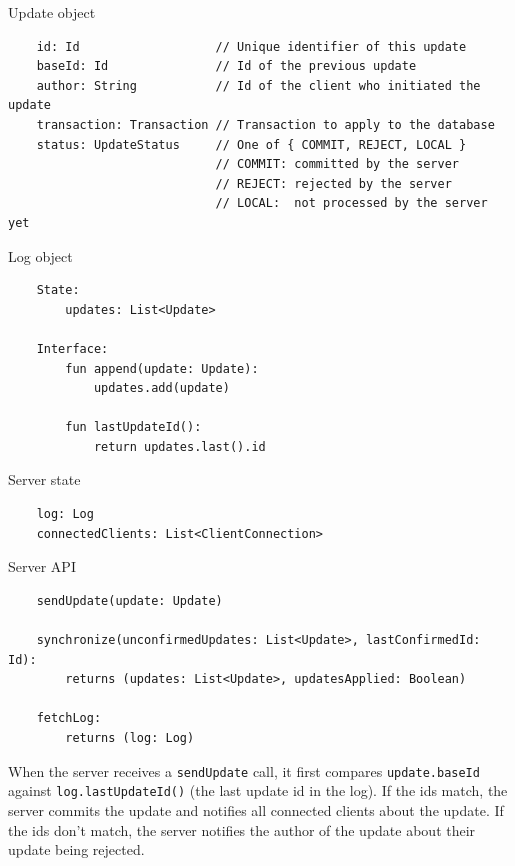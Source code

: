 \documentclass[a4paper, 11pt, oneside]{article}
\theoremstyle{definition}
\begin{document}
\begin{algorithm}
    \caption{Update object}\label{alg:update}
    \begin{verbatim}
    id: Id                   // Unique identifier of this update
    baseId: Id               // Id of the previous update
    author: String           // Id of the client who initiated the update
    transaction: Transaction // Transaction to apply to the database
    status: UpdateStatus     // One of { COMMIT, REJECT, LOCAL }
                             // COMMIT: committed by the server
                             // REJECT: rejected by the server
                             // LOCAL:  not processed by the server yet
    \end{verbatim}
\end{algorithm}

\begin{algorithm}
    \caption{Log object}\label{alg:log}
    \begin{verbatim}
    State:
        updates: List<Update>
    
    Interface:
        fun append(update: Update):
            updates.add(update)

        fun lastUpdateId():
            return updates.last().id

    \end{verbatim}
\end{algorithm}

\begin{algorithm}
    \caption{Server state}\label{alg:server-state}
    \begin{verbatim}
    log: Log
    connectedClients: List<ClientConnection>
    \end{verbatim}
\end{algorithm}

\begin{algorithm}
    \caption{Server API}\label{alg:server-api}
    \begin{verbatim}
    sendUpdate(update: Update)

    synchronize(unconfirmedUpdates: List<Update>, lastConfirmedId: Id): 
        returns (updates: List<Update>, updatesApplied: Boolean)

    fetchLog:
        returns (log: Log)
    \end{verbatim}
\end{algorithm}

When the server receives a \verb|sendUpdate| call, it first compares \verb|update.baseId| against \verb|log.lastUpdateId()| (the last update id in the log). If the ids match, the server commits the update and notifies all connected clients about the update. If the ids don't match, the server notifies the author of the update about their update being rejected.
\end{document}
